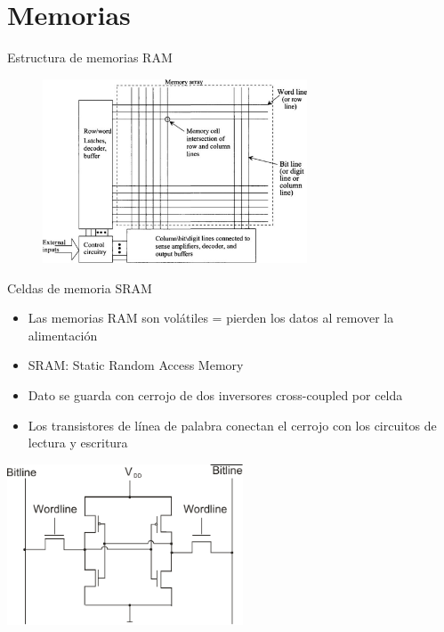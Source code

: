 \documentclass[aspectratio=169,t]{beamer}
\begin{document}
\section{Memorias}
\begin{frame}{Estructura de memorias RAM}

\begin{figure}[H]
    \centering
    \includegraphics[width=0.7\textwidth]{figuras/estructura_memorias_ram.png}
\end{figure}
    
\end{frame}


\begin{frame}{Celdas de memoria SRAM}
\begin{itemize}
	\item Las memorias RAM son volátiles = pierden los datos al remover la alimentación
	\item SRAM: Static Random Access Memory
	\item Dato se guarda con cerrojo de dos inversores cross-coupled por celda
	\item Los transistores de línea de palabra conectan el cerrojo con los circuitos de lectura y escritura
\end{itemize}

\centering
\includegraphics[width=7cm]{SRAM}
\end{frame}
\end{document}
